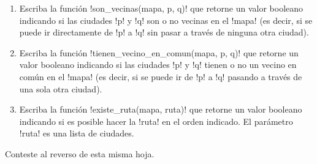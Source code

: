 \begin{enumerate}[leftmargin=0pt,label=\emph{\alph*})]

  \item
    Escriba la función \li!son_vecinas(mapa, p, q)!
    que retorne un valor booleano
    indicando si las ciudades \li!p! y \li!q!
    son o no vecinas en el \li!mapa!
    (es decir, si se puede ir directamente de \li!p! a \li!q!
    sin pasar a través de ninguna otra ciudad).
    

  \item
    Escriba la función \li!tienen_vecino_en_comun(mapa, p, q)!
    que retorne un valor booleano
    indicando si las ciudades \li!p! y \li!q!
    tienen o no un vecino en común en el \li!mapa!
    (es decir, si se puede ir de \li!p! a \li!q!
    pasando a través de una sola otra ciudad).
    

  \item
    Escriba la función \li!existe_ruta(mapa, ruta)!
    que retorne un valor booleano
    indicando si es posible hacer la \li!ruta! en el orden indicado.
    El parámetro \li!ruta! es una lista de ciudades.
    

\end{enumerate}

Conteste al reverso de esta misma hoja.

